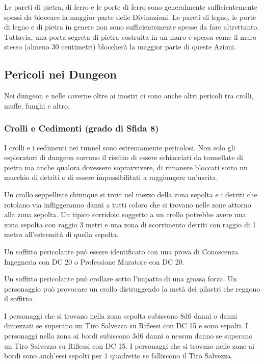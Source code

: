 \begin{multicols}{2}
Le pareti di pietra, di ferro e le porte di ferro sono generalmente sufficientemente spessi da bloccare la maggior parte delle Divinazioni. Le pareti di legno, le porte di legno e di pietra in genere non sono sufficientemente spesse da fare altrettanto. Tuttavia, una porta segreta di pietra costruita in un muro e spessa come il muro stesso (almeno 30 centimetri) bloccherà la maggior parte di queste Azioni.

\subsection{Pericoli nei Dungeon}

Nei dungeon e nelle caverne oltre ai mostri ci sono anche altri pericoli tra crolli, muffe, funghi e altro.

\subsubsection{Crolli e Cedimenti (grado di Sfida 8)}

I crolli e i cedimenti nei tunnel sono estremamente pericolosi. Non solo gli esploratori di dungeon corrono il rischio di essere schiacciati da tonnellate di pietra ma anche qualora dovessero sopravvivere, di rimanere bloccati sotto un mucchio di detriti o di essere impossibilitati a raggiungere un'uscita.

Un crollo seppellisce chiunque si trovi nel mezzo della zona sepolta e i detriti che rotolano via infliggeranno danni a tutti coloro che si trovano nelle zone attorno alla zona sepolta. Un tipico corridoio soggetto a un crollo potrebbe avere una zona sepolta con raggio 3 metri e una zona di scorrimento detriti con raggio di 1 metro all'estremità di quella sepolta.

Un soffitto pericolante può essere identificato con una prova di Conoscenza Ingegneria con DC 20 o Professione Muratore con DC 20.

Un soffitto pericolante può crollare sotto l'impatto di una grossa forza. Un personaggio può provocare un crollo distruggendo la metà dei pilastri che reggono il soffitto.

I personaggi che si trovano nella zona sepolta subiscono 8d6 danni o danni dimezzati se superano un Tiro Salvezza su Riflessi con DC 15 e sono sepolti. I personaggi nella zona ai bordi subiscono 3d6 danni o nessun danno se superano un Tiro Salvezza su Riflessi con DC 15. I personaggi che si trovano nelle zone ai bordi sono anch'essi sepolti per 1 quadretto se falliscono il Tiro Salvezza.


\end{multicols}
